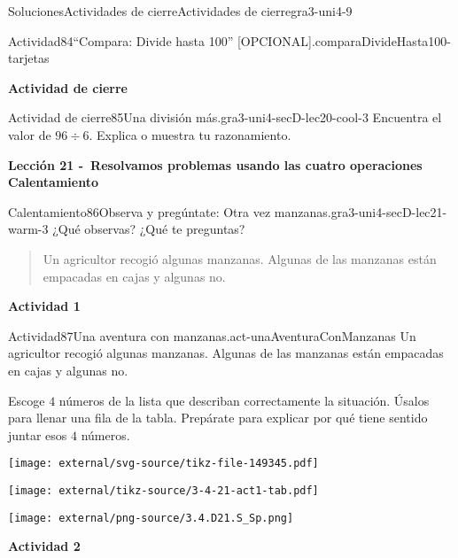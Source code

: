 \documentclass[twoside,10pt,]{article}
\begin{document}
\begin{solutions-section}{Soluciones}{Actividades de cierre}{}{Actividades de cierre}{}{}{gra3-uni4-9}
\begin{activitysolution}{Actividad}{84}{“Compara: Divide hasta 100” [OPCIONAL].}{comparaDivideHasta100-tarjetas}
\end{activitysolution}%
\par\medskip
\noindent\textbf{\large{}\space\textperiodcentered\space{}Actividad de cierre}
\begin{projectsolution}{Actividad de cierre}{85}{Una división más.}{gra3-uni4-secD-lec20-cool-3}%
Encuentra el valor de \(96 \div 6\). Explica o muestra tu razonamiento.%
\end{projectsolution}%
\par\medskip
\noindent\textbf{\large{}\space\textperiodcentered\space{}Lección 21 -~Resolvamos problemas usando las cuatro operaciones\\
\space\textperiodcentered\space{}Calentamiento}
\begin{explorationsolution}{Calentamiento}{86}{Observa y pregúntate: Otra vez manzanas.}{gra3-uni4-secD-lec21-warm-3}%
¿Qué observas? ¿Qué te preguntas?%
\par
\begin{quote}%
Un agricultor recogió algunas manzanas. Algunas de las manzanas están empacadas en cajas y algunas no.\end{quote}
%
\end{explorationsolution}%
\par\medskip
\noindent\textbf{\large{}\space\textperiodcentered\space{}Actividad 1}
\begin{activitysolution}{Actividad}{87}{Una aventura con manzanas.}{act-unaAventuraConManzanas}%
Un agricultor recogió algunas manzanas. Algunas de las manzanas están empacadas en cajas y algunas no.%
\par
Escoge \(4\) números de la lista que describan correctamente la situación. Úsalos para llenar una fila de la tabla. Prepárate para explicar por qué tiene sentido juntar esos \(4\) números.%
\begin{image}{0}{1}{0}{}%
\texttt{[image: external/svg-source/tikz-file-149345.pdf]}
\end{image}%
\begin{image}{0}{1}{0}{}%
\texttt{[image: external/tikz-source/3-4-21-act1-tab.pdf]}
\end{image}%
\begin{image}{0.25}{0.5}{0.25}{}%
\texttt{[image: external/png-source/3.4.D21.S\_Sp.png]}
\end{image}%
\end{activitysolution}%
\par\medskip
\noindent\textbf{\large{}\space\textperiodcentered\space{}Actividad 2}

\end{solutions-section}
\end{document}
